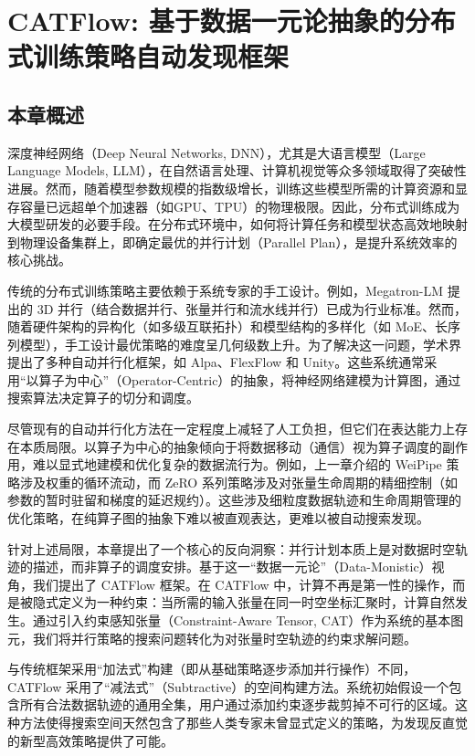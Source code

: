 
\chapter{CATFlow: 基于数据一元论抽象的分布式训练策略自动发现框架}

\section{本章概述}

深度神经网络（Deep Neural Networks, DNN），尤其是大语言模型（Large Language Models, LLM），在自然语言处理、计算机视觉等众多领域取得了突破性进展。然而，随着模型参数规模的指数级增长，训练这些模型所需的计算资源和显存容量已远超单个加速器（如GPU、TPU）的物理极限。因此，分布式训练成为大模型研发的必要手段。在分布式环境中，如何将计算任务和模型状态高效地映射到物理设备集群上，即确定最优的并行计划（Parallel Plan），是提升系统效率的核心挑战。

传统的分布式训练策略主要依赖于系统专家的手工设计。例如，Megatron-LM 提出的 3D 并行（结合数据并行、张量并行和流水线并行）已成为行业标准。然而，随着硬件架构的异构化（如多级互联拓扑）和模型结构的多样化（如 MoE、长序列模型），手工设计最优策略的难度呈几何级数上升。为了解决这一问题，学术界提出了多种自动并行化框架，如 Alpa、FlexFlow 和 Unity。这些系统通常采用“以算子为中心”（Operator-Centric）的抽象，将神经网络建模为计算图，通过搜索算法决定算子的切分和调度。

尽管现有的自动并行化方法在一定程度上减轻了人工负担，但它们在表达能力上存在本质局限。以算子为中心的抽象倾向于将数据移动（通信）视为算子调度的副作用，难以显式地建模和优化复杂的数据流行为。例如，上一章介绍的 WeiPipe 策略涉及权重的循环流动，而 ZeRO 系列策略涉及对张量生命周期的精细控制（如参数的暂时驻留和梯度的延迟规约）。这些涉及细粒度数据轨迹和生命周期管理的优化策略，在纯算子图的抽象下难以被直观表达，更难以被自动搜索发现。

针对上述局限，本章提出了一个核心的反向洞察：并行计划本质上是对数据时空轨迹的描述，而非算子的调度安排。基于这一“数据一元论”（Data-Monistic）视角，我们提出了 CATFlow 框架。在 CATFlow 中，计算不再是第一性的操作，而是被隐式定义为一种约束：当所需的输入张量在同一时空坐标汇聚时，计算自然发生。通过引入约束感知张量（Constraint-Aware Tensor, CAT）作为系统的基本图元，我们将并行策略的搜索问题转化为对张量时空轨迹的约束求解问题。

与传统框架采用“加法式”构建（即从基础策略逐步添加并行操作）不同，CATFlow 采用了“减法式”（Subtractive）的空间构建方法。系统初始假设一个包含所有合法数据轨迹的通用全集，用户通过添加约束逐步裁剪掉不可行的区域。这种方法使得搜索空间天然包含了那些人类专家未曾显式定义的策略，为发现反直觉的新型高效策略提供了可能。

